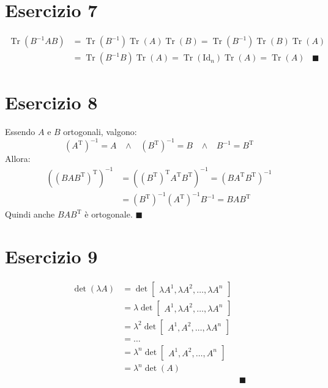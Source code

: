 \documentclass{article}
\newcommand*{\qed}{\blacksquare}
\newcommand*{\T}[1]{{#1}^\text{T}}  %
\DeclareMathOperator{\Tr}{Tr}  %
\begin{document}
\section*{Esercizio 7}
\[\begin{aligned}
    \Tr(B^{-1} A B) &=
    \Tr(B^{-1})\Tr(A)\Tr(B) =
    \Tr(B^{-1})\Tr(B)\Tr(A) \\ &=
    \Tr(B^{-1} B)\Tr(A) =
    \Tr(\text{Id}_n)\Tr(A) =
    \Tr(A)\hspace{10pt}\qed
\end{aligned}\]

\section*{Esercizio 8}
Essendo $A$ e $B$ ortogonali, valgono:
\[
    \left(A^\text{T}\right)^{-1}=A
    \hspace{10pt}\wedge\hspace{10pt}
    \left(B^\text{T}\right)^{-1}=B
    \hspace{10pt}\wedge\hspace{10pt}
    B^{-1}=B^\text{T}
\]
Allora:
\[\begin{aligned}
    \left(\T{\left(BA\T{B}\right)}\right)^{-1} &=
    \left(\T{\left(\T{B}\right)}\T{A}\T{B}\right)^{-1} =
    \left(B\T{A}\T{B}\right)^{-1} \\ &=
    \left(\T{B}\right)^{-1}\left(\T{A}\right)^{-1}B^{-1} =
    BA\T{B}
\end{aligned}\]
Quindi anche $BA\T{B}$ è ortogonale. $\qed$

\section*{Esercizio 9}
\[\begin{aligned}
    \det(\lambda A) &=
    \det\begin{bmatrix}
        \lambda A^1,\lambda A^2,\dots,\lambda A^n
    \end{bmatrix} \\ &=
    \lambda \det\begin{bmatrix}
        A^1,\lambda A^2,\dots,\lambda A^n
    \end{bmatrix} \\ &=
    \lambda^2 \det\begin{bmatrix}
        A^1, A^2,\dots,\lambda A^n
    \end{bmatrix} \\ &= \dots \\ &=
    \lambda^n\det\begin{bmatrix}
        A^1,A^2,\dots,A^n
    \end{bmatrix} \\ &=
    \lambda^n\det(A) \\
    &&\qed
\end{aligned}\]
\end{document}
